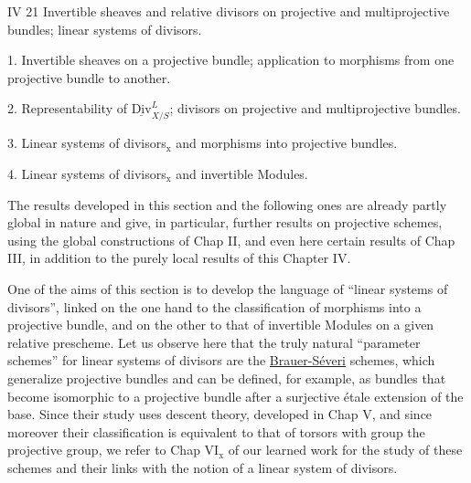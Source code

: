 
IV 21 Invertible sheaves and relative divisors on projective
and multiprojective bundles; linear systems of divisors.

1. Invertible sheaves on a projective bundle; application to
morphisms from one projective bundle to another.

2. Representability of $\underline{\mathrm{Div}}^{L}_{X/S}$;  divisors on projective and
multiprojective bundles.

3. Linear systems of divisors$_{\mathrm{x}}$ and morphisms into projective
bundles.

4. Linear systems of divisors$_{\mathrm{x}}$ and invertible Modules.

The results developed in this section and the following ones
are already partly global in nature and give, in particular, further
results on projective schemes, using  the
global constructions of Chap II, and even here certain results of
Chap III, in addition to the purely local results of this Chapter IV.

One of the aims of this section is to develop the language of
``linear systems of divisors'', linked on the one hand to the classification of
morphisms into a projective bundle, and on the other to that of invertible Modules
on a given relative prescheme. Let us observe here that the
truly natural ``parameter schemes'' for linear systems of
divisors are the \uline{Brauer-Séveri} schemes, which generalize projective
bundles and can be defined, for example, as bundles that become
isomorphic to a projective bundle after a surjective étale extension of
the base. Since their study uses descent theory, developed
in Chap V, and since moreover their classification is equivalent to that of
 torsors with group the projective group, we
refer to Chap VI$_{\mathrm{x}}$ of our learned work for the study of these schemes and their links with the notion of a
linear system of divisors.

